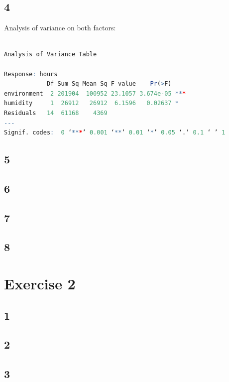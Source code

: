 \documentclass{article}
\begin{document}
    \subsection*{4}
      Analysis of variance on both factors:\\\\
      \begin{lstlisting}[language=R]
Analysis of Variance Table

Response: hours
            Df Sum Sq Mean Sq F value    Pr(>F)    
environment  2 201904  100952 23.1057 3.674e-05 ***
humidity     1  26912   26912  6.1596   0.02637 *  
Residuals   14  61168    4369                      
---
Signif. codes:  0 ‘***’ 0.001 ‘**’ 0.01 ‘*’ 0.05 ‘.’ 0.1 ‘ ’ 1
      \end{lstlisting}
    
    \subsection*{5}
    
    \subsection*{6}
    
    \subsection*{7}
    
    \subsection*{8}
    
  \section*{Exercise 2}
    \subsection*{1}
     
    \subsection*{2}
    
    \subsection*{3}
    
\end{document}
